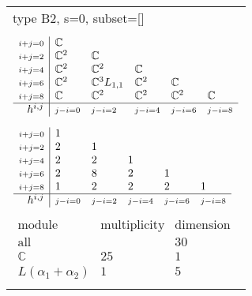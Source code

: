 \documentclass[crop,border=2mm]{standalone}
\begin{document}
\begin{tabular}{l}
{\huge type B2, s=0, subset=[]}\\ \\


$\displaystyle
\begin{array}{r|l l l l l}
	{\scriptstyle i+j=0}&\mathbb{C}&&&&\\
	{\scriptstyle i+j=2}&\mathbb{C}^{2}&\mathbb{C}&&&\\
	{\scriptstyle i+j=4}&\mathbb{C}^{2}&\mathbb{C}^{2}&\mathbb{C}&&\\
	{\scriptstyle i+j=6}&\mathbb{C}^{2}&\mathbb{C}^{3}L_{1,1}&\mathbb{C}^{2}&\mathbb{C}&\\
	{\scriptstyle i+j=8}&\mathbb{C}&\mathbb{C}^{2}&\mathbb{C}^{2}&\mathbb{C}^{2}&\mathbb{C}\\
	\hline h^{i,j}&{\scriptstyle j-i=0}&{\scriptstyle j-i=2}&{\scriptstyle j-i=4}&{\scriptstyle j-i=6}&{\scriptstyle j-i=8}
\end{array}
$ \\ \\


$\displaystyle
\begin{array}{r|l l l l l}
	{\scriptstyle i+j=0}&1&&&&\\
	{\scriptstyle i+j=2}&2&1&&&\\
	{\scriptstyle i+j=4}&2&2&1&&\\
	{\scriptstyle i+j=6}&2&8&2&1&\\
	{\scriptstyle i+j=8}&1&2&2&2&1\\
	\hline h^{i,j}&{\scriptstyle j-i=0}&{\scriptstyle j-i=2}&{\scriptstyle j-i=4}&{\scriptstyle j-i=6}&{\scriptstyle j-i=8}
\end{array}
$ \\ \\


$\displaystyle
\begin{array}{rll}
	\text{module}&\text{multiplicity}&\text{dimension} \\ \hline \text{all}&&30 \\
	\mathbb{C}&25&1\\
	L\left(\alpha_{1}+\alpha_{2}\right)&1&5
\end{array}
$ \\ \\

\end{tabular}
\end{document}
